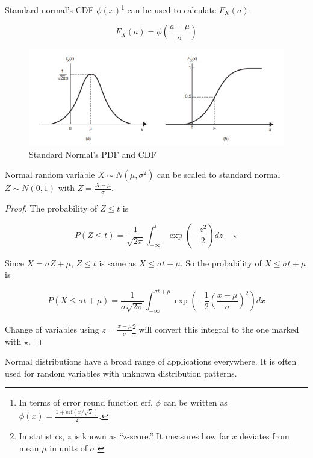 \documentclass[12pt, a4paper]{article}
\begin{document}
Standard normal's CDF $\phi(x)$\footnote{In terms of error round function $\text{erf}$, $\phi$ can be written as $\phi(x)=\frac{1+\text{erf}(x/\sqrt{2})}{2}$.} can be used to calculate $F_X(a)$:

$$F_X(a)=\phi\left( \frac{a-\mu}{\sigma} \right)$$

\begin{figure}[H]
\centering
\includegraphics[width=120mm]{17.png}
\caption{Standard Normal's PDF and CDF}
\end{figure}

Normal random variable $X\sim N(\mu,\sigma^2)$ can be scaled to standard normal $Z\sim N(0,1)$ with $Z=\frac{X-\mu}{\sigma}$.

\begin{proof}
The probability of $Z\le t$ is

$$P(Z\le t)=\frac{1}{\sqrt{2\pi}}\int_{-\infty}^t \exp\left(-\frac{z^2}{2}\right) dz \quad\star$$

Since $X=\sigma Z+\mu$, $Z\le t$ is same as $X\le \sigma t+\mu$. So the probability of $X\le \sigma t+\mu$ is

$$P(X\le \sigma t+\mu)=\frac{1}{\sigma\sqrt{2\pi}} \int_{-\infty}^{\sigma t+\mu} \exp\left(-\frac12 \left( \frac{x-\mu}{\sigma} \right)^2\right) dx$$

Change of variables using $z=\frac{x-\mu}{\sigma}$\footnote{In statistics, $z$ is known as ``z-score.'' It measures how far $x$ deviates from mean $\mu$ in units of $\sigma$.} will convert this integral to the one marked with $\star$.
\end{proof}

Normal distributions have a broad range of applications everywhere. It is often used for random variables with unknown distribution patterns.
\end{document}
